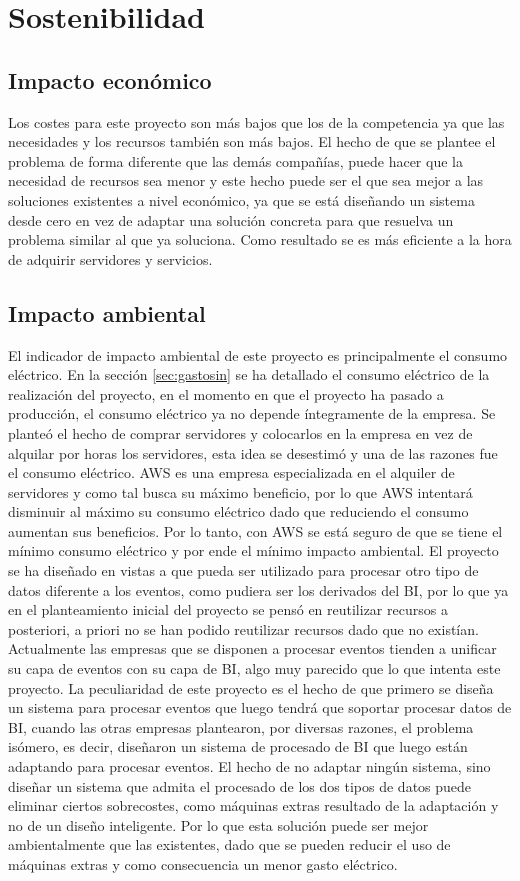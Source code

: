 \chapter{Sostenibilidad}
\section{Impacto económico}\label{sec:imec}
 
Los costes para este proyecto son más bajos que los de la competencia ya que las necesidades y los recursos también son más bajos. El hecho de que se plantee el problema de forma diferente que las demás compañías, puede hacer que la necesidad de recursos sea menor y este hecho puede ser el que sea mejor a las soluciones existentes a nivel económico, ya que se está diseñando un sistema desde cero en vez de adaptar una solución concreta para que resuelva un problema similar al que ya soluciona. Como resultado se es más eficiente a la hora de adquirir servidores y servicios.

\section{Impacto ambiental}\label{sec:imam}
El indicador de impacto ambiental de este proyecto es principalmente el consumo eléctrico. En la sección \ref{sec:gastosin} se ha detallado el consumo eléctrico de la realización del proyecto, en el momento en que el proyecto ha pasado a producción, el consumo eléctrico ya no depende íntegramente de la empresa. Se planteó el hecho de comprar servidores y colocarlos en la empresa en vez de alquilar por horas los servidores, esta idea se desestimó y una de las razones fue el consumo eléctrico. AWS es una empresa especializada en el alquiler de servidores y como tal busca su máximo beneficio, por lo que AWS intentará disminuir al máximo su consumo eléctrico dado que reduciendo el consumo aumentan sus beneficios. Por lo tanto, con AWS se está seguro de que se tiene el mínimo consumo eléctrico y por ende el mínimo impacto ambiental.
El proyecto se ha diseñado en vistas a que pueda ser utilizado para procesar otro tipo de datos diferente a los eventos, como pudiera ser los derivados del BI, por lo que ya en el planteamiento inicial del proyecto se pensó en reutilizar recursos a posteriori, a priori no se han podido reutilizar recursos dado que no existían. 
Actualmente las empresas que se disponen a procesar eventos tienden a unificar su capa de eventos con su capa de BI, algo muy parecido que lo que intenta este proyecto. La peculiaridad de este proyecto es el hecho de que primero se diseña un sistema para procesar eventos que luego tendrá que soportar procesar datos de BI, cuando las otras empresas plantearon, por diversas razones, el problema isómero, es decir, diseñaron un sistema de procesado de BI que luego están adaptando para procesar eventos. El hecho de no adaptar ningún sistema, sino diseñar un sistema que admita el procesado de los dos tipos de datos puede eliminar ciertos sobrecostes, como máquinas extras resultado de la adaptación y no de un diseño inteligente. Por lo que esta solución puede ser mejor ambientalmente que las existentes, dado que se pueden reducir el uso de máquinas extras y como consecuencia un menor gasto eléctrico.

